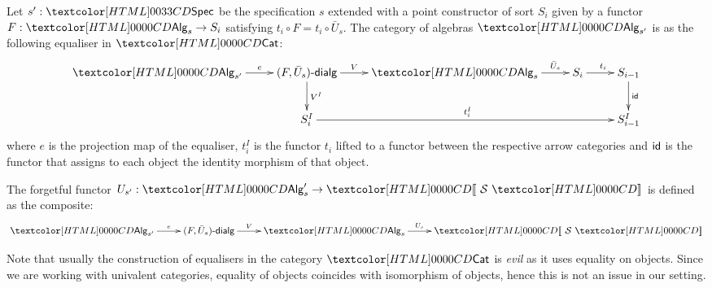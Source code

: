 \begin{definition}
  Let $s' : \specty$ be the specification $s$ extended with a
  point constructor of sort $S_i$ given by a functor $F : \Alg_s \to S_i$
  satisfying $t_i \circ F = t_i \circ \bar{U}_s$. The category of
  algebras $\Alg_{s'}$ is as the following equaliser in $\Cat$:
  \[
  \xymatrix{
    \Alg_{s'} \ar[r]^-{e} &\dialgcat{F}{\bar{U}_s} \ar[r]^-{V} \ar[d]^-{V^I} &\Alg_s \ar[r]^-{\bar{U}_s} &S_i \ar[r]^{t_i} &S_{i-1} \ar[d]^-{\id} \\
    &S_i^I \ar[rrr]^{t_i^I} && &S_{i-1}^I }
  \]
  where $e$ is the projection map of the equaliser, $t_i^I$ is the
  functor $t_i$ lifted to a functor between the respective arrow
  categories and $\id$ is the functor that assigns to each object the
  identity morphism of that object.

  The forgetful functor $U_{s'} : \Alg_s' \to \SortCat{\Ss}$ is defined as the composite:
  \[
    \xymatrix{
      \Alg_{s'} \ar[r]^-{e} &\dialgcat{F}{\bar{U}_s} \ar[r]^-{V} &\Alg_s \ar[r]^-{U_s} &\SortCat{\Ss}
    }
  \]
\end{definition}

Note that usually the construction of equalisers in the category
$\Cat$ is \emph{evil} as it uses equality on objects. Since we are
working with univalent categories, equality of objects coincides with
isomorphism of objects, hence this is not an issue in our setting.

